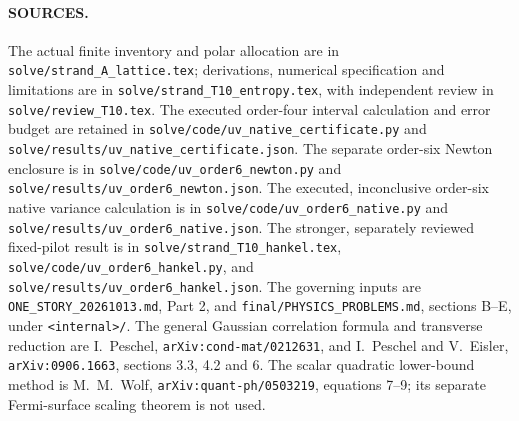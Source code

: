 \paragraph{SOURCES.}
The actual finite inventory and polar allocation are in
\texttt{solve/strand\_A\_lattice.tex}; derivations, numerical specification
and limitations are in \texttt{solve/strand\_T10\_entropy.tex}, with
independent review in \texttt{solve/review\_T10.tex}. The executed
order-four interval calculation and error budget are retained in
\texttt{solve/code/uv\_native\_certificate.py} and
\texttt{solve/results/uv\_native\_certificate.json}.
The separate order-six Newton enclosure is in
\texttt{solve/code/uv\_order6\_newton.py} and
\texttt{solve/results/uv\_order6\_newton.json}.
The executed, inconclusive order-six native variance calculation is in
\texttt{solve/code/uv\_order6\_native.py} and
\texttt{solve/results/uv\_order6\_native.json}.
The stronger, separately reviewed fixed-pilot result is in
\texttt{solve/strand\_T10\_hankel.tex},
\texttt{solve/code/uv\_order6\_hankel.py}, and
\texttt{solve/results/uv\_order6\_hankel.json}.
The governing inputs
are \texttt{ONE\_STORY\_20261013.md}, Part 2, and
\texttt{final/PHYSICS\_PROBLEMS.md}, sections B--E, under
\texttt{<internal>/}.
The general Gaussian correlation formula and transverse reduction are
I.~Peschel, \texttt{arXiv:cond-mat/0212631}, and I.~Peschel and
V.~Eisler, \texttt{arXiv:0906.1663}, sections 3.3, 4.2 and 6.
The scalar quadratic lower-bound method is M.~M.~Wolf,
\texttt{arXiv:quant-ph/0503219}, equations 7--9; its separate
Fermi-surface scaling theorem is not used.
